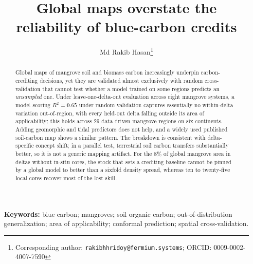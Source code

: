 \documentclass[11pt]{article}
\title{\textbf{Global maps overstate the reliability of blue-carbon credits}}
\author[1,2]{Md Rakib Hasan\thanks{Corresponding author:
\texttt{rakibhhridoy@fermium.systems}; ORCID: 0009-0002-4007-7590}}
\affil[1]{Fermium Systems, Dhaka 1207, Bangladesh}
\affil[2]{Department of Soil, Water and Environment, University of Dhaka,
Dhaka 1000, Bangladesh}
\date{}
\begin{document}
\maketitle

\begin{abstract}
\noindent
Global maps of mangrove soil and biomass carbon increasingly underpin carbon-crediting
decisions, yet they are validated almost exclusively with random cross-validation that
cannot test whether a model trained on some regions predicts an \emph{unsampled} one.
Under leave-one-delta-out evaluation across eight mangrove systems, a model scoring
$R^2=0.65$ under random validation captures essentially no within-delta variation
out-of-region, with every held-out delta falling outside its area of applicability; this
holds across 29 data-driven mangrove regions on six continents. Adding geomorphic and
tidal predictors does not help, and a widely used published soil-carbon map shows a
similar pattern. The breakdown is consistent with delta-specific concept shift; in a
parallel test, terrestrial soil carbon transfers substantially better, so it is not a
generic mapping artifact. For the 8\% of global mangrove area in deltas without in-situ
cores, the stock that sets a crediting baseline cannot be pinned by a global model to
better than a sixfold density spread, whereas ten to twenty-five local cores recover most
of the lost skill.
\end{abstract}

\vspace{0.5em}
\noindent\textbf{Keywords:} blue carbon; mangroves; soil organic carbon;
out-of-distribution generalization; area of applicability; conformal prediction;
spatial cross-validation.

\end{document}
